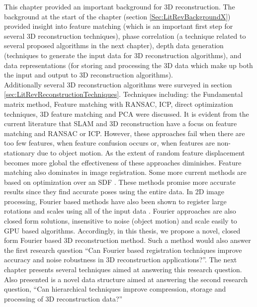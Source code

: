 
This chapter provided an important background for 3D reconstruction. The background at the start of the chapter (section \ref{Sec:LitRevBackgroundX}) provided insight into feature matching (which is an important first step for several 3D reconstruction techniques), phase correlation (a technique related to several proposed algorithms in the next chapter), depth data generation (techniques to generate the input data for 3D reconstruction algorithms), and data representations (for storing and processing the 3D data which make up both the input and output to 3D reconstruction algorithms). \\

Additionally several 3D reconstruction algorithms were surveyed in section \ref{sec:LitRevReconstructionTechniques}. Techniques including: the Fundamental matrix method, Feature matching with RANSAC, ICP, direct optimization techniques, 3D feature matching and PCA were discussed. It is evident from the current literature that SLAM and 3D reconstruction have a focus on feature matching and RANSAC or ICP. However, these approaches fail when there are too few features, when feature confusion occurs or, when features are non-stationary due to object motion. As the extent of random feature displacement becomes more global the effectiveness of these approaches diminishes. Feature matching also dominates in image registration. Some more current methods are based on optimization over an SDF \cite{Bylow13Real,Rusinkiewicz02Real}. These methods promise more accurate results since they find accurate poses using the entire data. In 2D image processing, Fourier based methods have also been shown to register large rotations and scales using all of the input data \cite{Gonzalez11Improving}. Fourier approaches are also closed form solutions, insensitive to noise (object motion) and scale easily to GPU based algorithms. Accordingly, in this thesis, we propose a novel, closed form Fourier based 3D reconstruction method. Such a method would also answer the first research question ``Can Fourier based registration techniques improve accuracy and noise robustness in 3D reconstruction applications?''. The next chapter presents several techniques aimed at answering this research question. Also presented is a novel data structure aimed at answering the second research question, ``Can hierarchical techniques improve compression, storage and processing of 3D reconstruction data?'' \\
